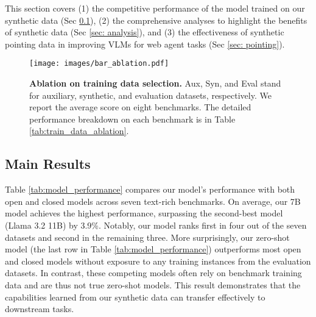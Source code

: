 
This section covers (1) the competitive performance of the model trained on our synthetic data (Sec \ref{sec: main_results}), (2) the comprehensive analyses to highlight the benefits of synthetic data (Sec \ref{sec: analysis}), and (3) the effectiveness of synthetic pointing data in improving VLMs for web agent tasks (Sec \ref{sec: pointing}).

\begin{figure}[!t]
    \centering
    \texttt{[image: images/bar\_ablation.pdf]}
    \vspace{-.8cm}
    \caption{\textbf{Ablation on training data selection.} Aux, Syn, and Eval stand for auxiliary, synthetic, and evaluation datasets, respectively. We report the average score on eight benchmarks. The detailed performance breakdown on each benchmark is in Table \ref{tab:train_data_ablation}.}
    \label{fig: ablation}
    \vspace{-0.3cm}
\end{figure}

\subsection{Main Results} \label{sec: main_results}

Table \ref{tab:model_performance} compares our model’s performance with both open and closed models across seven text-rich benchmarks. 
On average, our 7B model achieves the highest performance, surpassing the second-best model (Llama 3.2 11B) by 3.9\%. 
Notably, our model ranks first in four out of the seven datasets and second in the remaining three.
More surprisingly, our zero-shot model (the last row in Table \ref{tab:model_performance}) outperforms most open and closed models without exposure to any training instances from the evaluation datasets. 
In contrast, these competing models often rely on benchmark training data and are thus not true zero-shot models. 
This result demonstrates that the capabilities learned from our synthetic data can transfer effectively to downstream tasks.



